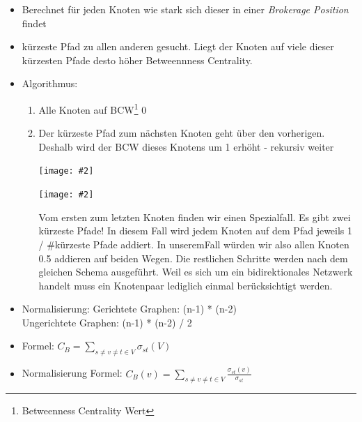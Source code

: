 \documentclass[a4paper,landscape,12pt]{scrreprt}
\newenvironment{Figure}
  {\noindent\minipage{\linewidth}}
  {\endminipage}
\newcommand{\pic}[2][ ]{
\begin{Figure}
 \texttt{[image: \#2]}
 \captionof{figure}{#1}
\end{Figure}
}
\begin{document}
\begin{multicols*}{2}
\begin{description}
\begin{itemize}
	\item Berechnet für jeden Knoten wie stark sich dieser in einer \textit{Brokerage Position} findet
	\item kürzeste Pfad zu allen anderen gesucht. Liegt der Knoten auf viele dieser kürzesten Pfade desto höher Betweennness Centrality.
	\item Algorithmus:
	\begin{enumerate}
		\item Alle Knoten auf BCW\footnote{Betweenness Centrality Wert} 0
		\item Der kürzeste Pfad zum nächsten Knoten geht über den vorherigen. Deshalb wird der BCW dieses Knotens um 1 erhöht - rekursiv weiter
        \pic{img/bcen1.png}
        \pic{img/bcen2.png}
        Vom ersten zum letzten Knoten finden wir einen Spezialfall. Es gibt zwei kürzeste Pfade! In
diesem Fall wird jedem Knoten auf dem Pfad jeweils 1 / \#kürzeste Pfade addiert. In unseremFall würden wir also allen Knoten 0.5 addieren auf beiden Wegen. Die restlichen Schritte werden nach dem gleichen Schema ausgeführt. Weil es sich um ein
bidirektionales Netzwerk handelt muss ein Knotenpaar lediglich einmal berücksichtigt werden.
	\end{enumerate}
	\item Normalisierung:  Gerichtete Graphen: (n-1) * (n-2)\\
 Ungerichtete Graphen: (n-1) * (n-2) / 2
\item Formel: $C_B = \sum_{s \neq v \neq t \in V}\sigma_{st}(V)$
\item Normalisierung Formel: $C_B(v) =\sum_{s \neq v \neq t \in V} \frac{\sigma_{st}(v)}{\sigma_{st}}$
\end{itemize}

\end{description}


\end{multicols*}
\end{document}
